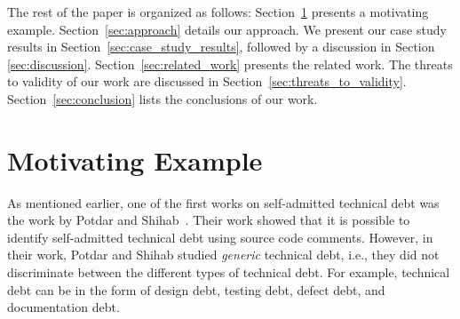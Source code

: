 \documentclass[conference]{IEEEtran}
\newcommand{\nikos}[1]{\textcolor{red}{{\it [Nikos: #1]}}}
\newcommand{\everton}[1]{\textcolor{blue}{{\it [Everton: #1]}}}
\newcommand{\rqi}{\textbf{RQ1. What comment patterns indicate self-admitted design technical debt? How are these comment patterns different than previously proposed comment patterns?\\}}
\newcommand{\rqii}{\textbf{RQ2. Can we effectively detect self-admitted design technical debt using the proposed comment patterns?\\}}
\newcommand{\SADTD}{Self-admitted Design Technical Debt\xspace}
\begin{document}
%
%


The rest of the paper is organized as follows:  Section~\ref{sec:motivating_example} presents a motivating example. Section~\ref{sec:approach} details our approach. We present our case study results in Section~\ref{sec:case_study_results}, followed by a discussion in Section \ref{sec:discussion}. Section~\ref{sec:related_work} presents the related work. The threats to validity of our work are discussed in Section~\ref{sec:threats_to_validity}. Section~\ref{sec:conclusion} lists the conclusions of our work.



\section{Motivating Example}
\label{sec:motivating_example}
As mentioned earlier, one of the first works on self-admitted technical debt was the work by Potdar and Shihab~\cite{Potdar2014ICSME}. Their work showed that it is possible to identify self-admitted technical debt using source code comments. However, in their work, Potdar and Shihab studied \textit{generic} technical debt, i.e., they did not discriminate between the different types of technical debt. For example, technical debt can be in the form of design debt, testing debt, defect debt, and documentation debt. 
\end{document}

